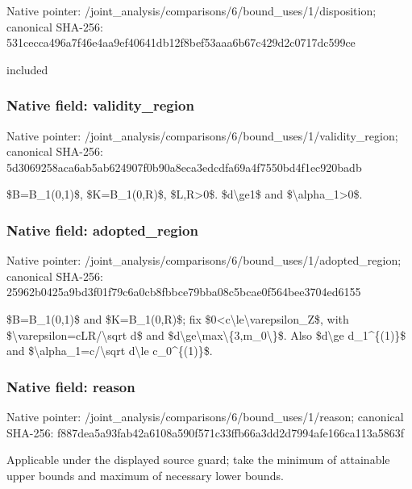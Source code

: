 \documentclass[10pt,a4paper]{article}
\begin{document}
Native pointer: /joint\_analysis/comparis\allowbreak{}ons/6/bound\_uses/1/dispo\allowbreak{}sition; canonical SHA-256: 531cecca496a7f46e4aa9ef4\allowbreak{}0641db12f8bef53aaa6b67c4\allowbreak{}29d2c0717dc599ce


included


\subsubsection{Native field: validity\_region}


Native pointer: /joint\_analysis/comparis\allowbreak{}ons/6/bound\_uses/1/valid\allowbreak{}ity\_region; canonical SHA-256: 5d3069258aca6ab5ab624907\allowbreak{}f0b90a8eca3edcdfa69a4f75\allowbreak{}50bd4f1ec920badb


\$B=B\_1(0,1)\$, \$K=B\_1(0,R)\$, \$L,R>0\$. \$d\textbackslash{}ge1\$ and \$\textbackslash{}alpha\_1>0\$.


\subsubsection{Native field: adopted\_region}


Native pointer: /joint\_analysis/comparis\allowbreak{}ons/6/bound\_uses/1/adopt\allowbreak{}ed\_region; canonical SHA-256: 25962b0425a9bd3f01f79c6a\allowbreak{}0cb8fbbce79bba08c5bcae0f\allowbreak{}564bee3704ed6155


\$B=B\_1(0,1)\$ and \$K=B\_1(0,R)\$; fix \$0<c\textbackslash{}le\textbackslash{}varepsilon\_Z\$, with \$\textbackslash{}varepsilon=cLR/\textbackslash{}sqrt d\$ and \$d\textbackslash{}ge\textbackslash{}max\textbackslash{}\{3,m\_0\textbackslash{}\}\$. Also \$d\textbackslash{}ge d\_1\textasciicircum{}\{(1)\}\$ and \$\textbackslash{}alpha\_1=c/\textbackslash{}sqrt d\textbackslash{}le c\_0\textasciicircum{}\{(1)\}\$.


\subsubsection{Native field: reason}


Native pointer: /joint\_analysis/comparis\allowbreak{}ons/6/bound\_uses/1/reaso\allowbreak{}n; canonical SHA-256: f887dea5a93fab42a6108a59\allowbreak{}0f571c33ffb66a3dd2d7994a\allowbreak{}fe166ca113a5863f


Applicable under the displayed source guard; take the minimum of attainable upper bounds and maximum of necessary lower bounds.
\end{document}
